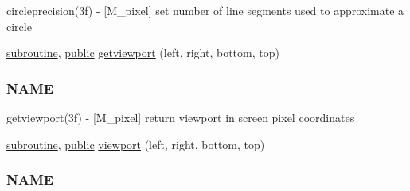 \begin{DoxyCompactItemize}
\begin{DoxyCompactList}
circleprecision(3f) -\/ \mbox{[}M\+\_\+pixel\mbox{]} set number of line segments used to approximate a circle \end{DoxyCompactList}\item 
\hyperlink{M__stopwatch_83_8txt_acfbcff50169d691ff02d4a123ed70482}{subroutine}, \hyperlink{M__stopwatch_83_8txt_a2f74811300c361e53b430611a7d1769f}{public} \hyperlink{namespacem__pixel_a9f382cf8d3b69e11d1fdd2f2a4f59dea}{getviewport} (left, right, bottom, top)
\begin{DoxyCompactList}\small\item\em \subsubsection*{N\+A\+ME}

getviewport(3f) -\/ \mbox{[}M\+\_\+pixel\mbox{]} return viewport in screen pixel coordinates \end{DoxyCompactList}\item 
\hyperlink{M__stopwatch_83_8txt_acfbcff50169d691ff02d4a123ed70482}{subroutine}, \hyperlink{M__stopwatch_83_8txt_a2f74811300c361e53b430611a7d1769f}{public} \hyperlink{namespacem__pixel_a43247343cd316e3aa075b44b5166e2e9}{viewport} (left, right, bottom, top)
\begin{DoxyCompactList}\small\item\em \subsubsection*{N\+A\+ME}


\end{DoxyCompactList}
\end{DoxyCompactItemize}
